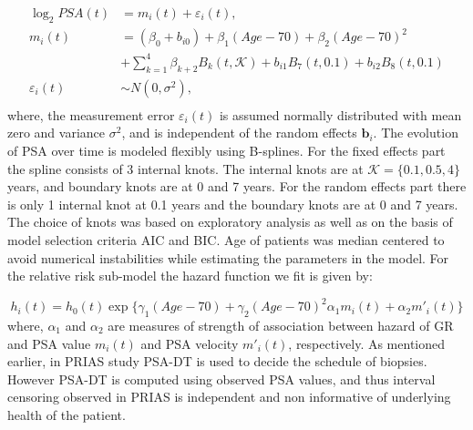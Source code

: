 \begin{equation}
\label{eq : long_model_prias}
\begin{aligned}
\log_2 PSA(t) &= m_i(t) + \varepsilon_i(t), \\
m_i(t) &= (\beta_0 + b_{i0}) + \beta_1 (Age-70) + \beta_2 (Age-70)^2\\ 
&+ \sum_{k=1}^4 \beta_{k+2} B_k(t,\mathcal{K}) + b_{i1} B_7(t, 0.1) + b_{i2} B_8(t, 0.1) \\
\varepsilon_i(t) & \sim N(0, \sigma^2),\\
\end{aligned}
\end{equation}
where, the measurement error $\varepsilon_i(t)$ is assumed normally distributed with mean zero and variance $\sigma^2$, and is independent of the random effects $\boldsymbol{b}_i$. The evolution of PSA over time is modeled flexibly using B-splines. For the fixed effects part the spline consists of 3 internal knots. The internal knots are at $\mathcal{K} =\{0.1, 0.5, 4\}$ years, and boundary knots are at 0 and 7 years. For the random effects part there is only 1 internal knot at 0.1 years and the boundary knots are at 0 and 7 years. The choice of knots was based on exploratory analysis as well as on the basis of model selection criteria AIC and BIC. Age of patients was median centered to avoid numerical instabilities while estimating the parameters in the model. For the relative risk sub-model the hazard function we fit is given by:

\begin{equation}
\label{eq : hazard_prias}
h_i(t) = h_0(t) \exp\{\gamma_1 (Age-70)  + \gamma_2 (Age-70)^2  \alpha_1 m_i(t) + \alpha_2 m'_i(t)\}
\end{equation}
where, $\alpha_1$ and $\alpha_2$ are measures of strength of association between hazard of GR and PSA value $m_i(t)$ and PSA velocity $m'_i(t)$, respectively. As mentioned earlier, in PRIAS study PSA-DT is used to decide the schedule of biopsies. However PSA-DT is computed using observed PSA values, and thus interval censoring observed in PRIAS is independent and non informative of underlying health of the patient.

